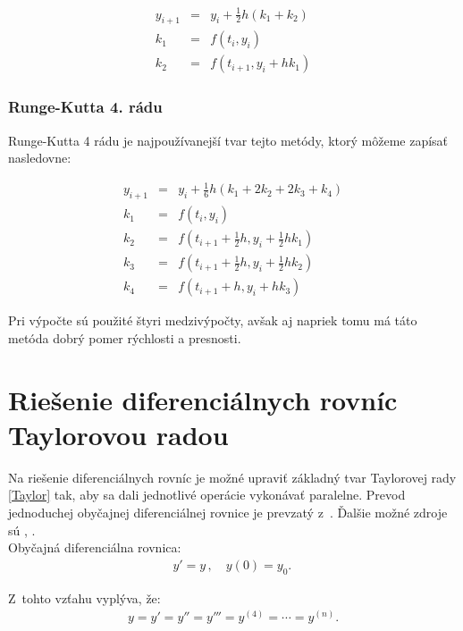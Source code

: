 \begin{eqnarray}
y_{i+1} & = & y_{i} + \frac{1}{2}h(k_{1} + k_{2}) \\
k_{1} & = & f(t_{i},y_{i}) \nonumber \\
k_{2} & = & f(t_{i+1}, y_{i} + hk_{1}) \nonumber
\end{eqnarray}


\newpage
\subsection{Runge-Kutta 4. rádu} \label{RK4}
Runge-Kutta 4 rádu je najpoužívanejší tvar tejto metódy, ktorý môžeme zapísať nasledovne:

\begin{eqnarray}
y_{i+1} & = & y_{i} + \frac{1}{6}h(k_{1} + 2k_{2} + 2k_{3} + k_{4}) \\
k_{1} & = & f(t_{i},y_{i}) \nonumber \\
k_{2} & = & f(t_{i+1} + \frac{1}{2}h, y_{i} + \frac{1}{2}hk_{1}) \nonumber \\
k_{3} & = & f(t_{i+1} + \frac{1}{2}h, y_{i} + \frac{1}{2}hk_{2}) \nonumber \\
k_{4} & = & f(t_{i+1} + h, y_{i} + hk_{3}) \nonumber
\end{eqnarray}

Pri výpočte sú použité štyri medzivýpočty, avšak aj napriek tomu má táto metóda dobrý pomer rýchlosti a presnosti.


\chapter{Riešenie diferenciálnych rovníc Taylorovou radou} \label{SOLUTION_WITH_TAYLOR}
Na riešenie diferenciálnych rovníc je možné upraviť základný tvar Taylorovej rady \eqref{Taylor} tak, aby sa dali jednotlivé operácie vykonávať paralelne. Prevod jednoduchej obyčajnej diferenciálnej rovnice je prevzatý z~\cite{MatecnyBP}. Ďalšie možné zdroje sú \cite{OpalkaDP}, \cite{KrausDisP}. \\

Obyčajná diferenciálna rovnica:
\begin{eqnarray}
y' = y \, , \quad y(0) = y_{0}. \, \label{jednoducha_rovnica}
\end{eqnarray}

Z~tohto vzťahu vyplýva, že:
\begin{eqnarray}
y = y' = y'' = y''' = y^{(4)} =\cdots = y^{(n)} .
\end{eqnarray}

